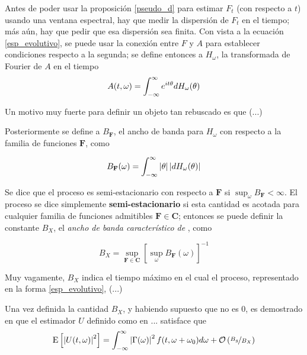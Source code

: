 Antes de poder usar la proposición \ref{pseudo_d} para estimar $F_t$ (con respecto a $t$) usando 
una ventana espectral, hay que medir la dispersión de $F_t$ en el tiempo; más aún, hay que
pedir que esa dispersión sea finita.
Con vista a la ecuación \ref{esp_evolutivo}, se puede usar la conexión entre $F$ y $A$ para
establecer condiciones respecto a la segunda; se define entonces a $H_\omega$, la transformada de
Fourier de $A$ en el tiempo
\begin{equation}
A(t,\omega) = \int_{-\infty}^{\infty} e^{i t \theta} dH_\omega(\theta)
\end{equation}

Un motivo muy fuerte para definir un objeto tan rebuscado es que (...)
%

Posteriormente se define a $B_{\mathbf{F}}$, el ancho de banda para $H_\omega$ con respecto a la 
familia de funciones $\mathbf{F}$, como

\begin{equation}
B_{\mathbf{F}}(\omega) = \int_{-\infty}^{\infty} \left| \theta \right| \left| dH_\omega(\theta) \right|
\end{equation}

Se dice que el proceso es semi-estacionario con respecto a $\mathbf{F}$ si 
$\sup_\omega B_{\mathbf{F}} < \infty$. El proceso se dice simplemente \textbf{semi-estacionario} 
si esta cantidad es acotada para cualquier familia de funciones admitibles 
$\mathbf{F} \in \mathbf{C}$; entonces se puede definir la constante $B_X$,
el \textit{ancho de banda característico de} \xt, como

\begin{equation}
B_X = \sup_{\mathbf{F}\in \mathbf{C}} \left[ \sup_\omega B_{\mathbf{F}}(\omega) \right]^{-1}
\end{equation}

Muy vagamente, $B_X$ indica el tiempo máximo en el cual el proceso, representado en la forma
\ref{esp_evolutivo}, (...)

Una vez definida la cantidad $B_X$, y habiendo supuesto que no es 0, es demostrado en
\cite{Priestley65} que el estimador $U$ definido como en ...
satisface que
\begin{equation}
\mathrm{E}\left[ \left| U(t,\omega) \right|^{2} \right] = \int_{-\infty}^{\infty} \left| \Gamma(\omega) \right|^{2} f(t,\omega+\omega_0) d\omega
+ \mathcal{O}\left( \nicefrac{B_g}{B_X} \right)
\end{equation}

